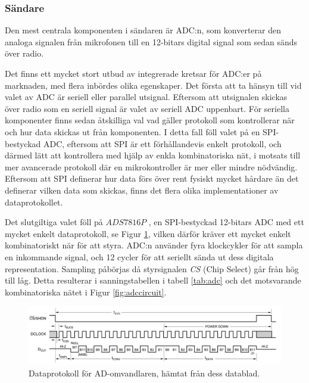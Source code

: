 \documentclass[a4paper,10pt]{article}
\begin{document}
\subsubsection{Sändare}

Den mest centrala komponenten i sändaren är ADC:n, som konverterar den analoga
signalen från mikrofonen till en 12-bitars digital signal som sedan sänds över
radio.

Det finns ett mycket stort utbud av integrerade kretsar för ADC:er på marknaden,
med flera inbördes olika egenskaper. Det första att ta hänsyn till vid valet av
ADC är seriell eller parallel utsignal. Eftersom att utsignalen skickas över 
radio som en seriell signal är valet av seriell ADC uppenbart. För seriella 
komponenter finns sedan åtskilliga val vad gäller protokoll som kontrollerar när
och hur data skickas ut från komponenten. I detta fall föll valet på en 
SPI-bestyckad ADC, eftersom att SPI är ett förhållandevis enkelt protokoll, och
därmed lätt att kontrollera med hjälp av enkla kombinatoriska nät, i motsats 
till mer avancerade protokoll där en mikrokontroller är mer eller mindre
nödvändig. Eftersom att SPI definerar hur data förs över rent fysiskt mycket
hårdare än det definerar vilken data som skickas, finns det flera olika 
implementationer av dataprotokollet.

Det slutgiltiga valet föll på $ADS7816P$ \cite{adc}, en SPI-bestyckad 12-bitars 
ADC med ett mycket enkelt dataprotokoll, se Figur \ref{fig:adcproto}, vilken 
därför kräver ett mycket enkelt kombinatoriskt när för att styra. ADC:n använder 
fyra klockcykler för att sampla en inkommande signal, och 12 cycler för att
seriellt sända ut dess digitala representation. Sampling påbörjas då 
styrsignalen \emph{CS} (Chip Select) går från hög till låg. Detta resulterar i 
sanningstabellen i tabell \ref{tab:adc} och det motsvarande kombinatoriska nätet 
i Figur \ref{fig:adccircuit}.

\begin{figure}[h]
\centering
\includegraphics[width=\textwidth]{adcdiagram.png}
\caption{Dataprotokoll för AD-omvandlaren, hämtat från dess datablad.}
\label{fig:adcproto}
\end{figure}
\end{document}
